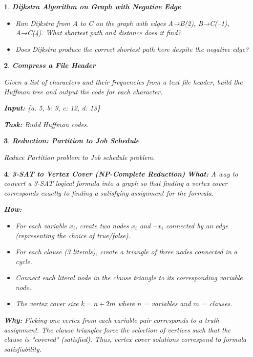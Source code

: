 \documentclass[%
addpoints]{exam}
\theoremstyle{problem}
\newtheorem{p}{}
\begin{document}
\begin{p}
\textbf{Dijkstra Algorithm on Graph with Negative Edge}

\begin{itemize}
\item Run Dijkstra from A to C on the graph with edges A→B(2), B→C(–1), A→C(4). What shortest path and distance does it find?
\item Does Dijkstra produce the correct shortest path here despite the negative edge?
\end{itemize}
\hfill \end{p}

\begin{p}
\textbf{Compress a File Header}

Given a list of characters and their frequencies from a text file header, build the Huffman tree and output the code for each character.

\textbf{Input:} \{a: 5, b: 9, c: 12, d: 13\}

\textbf{Task:} Build Huffman codes.
\hfill \end{p}

\begin{p}
\textbf{Reduction: Partition to Job Schedule}

Reduce Partition problem to Job schedule problem.
\hfill \end{p}


\begin{p}
\textbf{3-SAT to Vertex Cover (NP-Complete Reduction)}
\textbf{What:}
A way to convert a 3-SAT logical formula into a graph so that finding a vertex cover corresponds exactly to finding a satisfying assignment for the formula.

\textbf{How:}
\begin{itemize}
\item For each variable $x_i$, create two nodes $x_i$ and $\neg x_i$ connected by an edge (representing the choice of true/false).
\item For each clause (3 literals), create a triangle of three nodes connected in a cycle.
\item Connect each literal node in the clause triangle to its corresponding variable node.
\item The vertex cover size $k = n + 2m$ where $n$ = variables and $m$ = clauses.
\end{itemize}

\textbf{Why:} Picking one vertex from each variable pair corresponds to a truth assignment. The clause triangles force the selection of vertices such that the clause is "covered" (satisfied). Thus, vertex cover solutions correspond to formula satisfiability.
\hfill \end{p}
\end{document}
